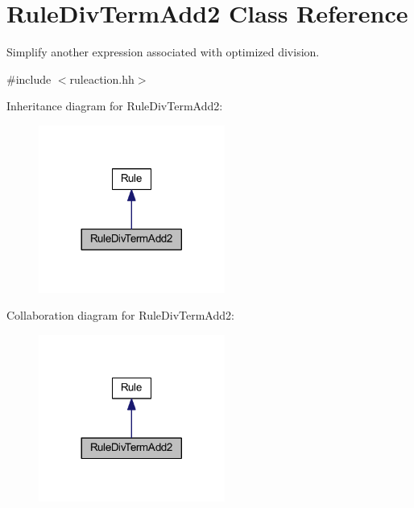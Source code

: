 \hypertarget{class_rule_div_term_add2}{}\section{Rule\+Div\+Term\+Add2 Class Reference}
\label{class_rule_div_term_add2}


Simplify another expression associated with optimized division.  




{\ttfamily \#include $<$ruleaction.\+hh$>$}



Inheritance diagram for Rule\+Div\+Term\+Add2\+:
\nopagebreak
\begin{figure}[H]
\begin{center}
\leavevmode
\includegraphics[width=173pt]{class_rule_div_term_add2__inherit__graph}
\end{center}
\end{figure}


Collaboration diagram for Rule\+Div\+Term\+Add2\+:
\nopagebreak
\begin{figure}[H]
\begin{center}
\leavevmode
\includegraphics[width=173pt]{class_rule_div_term_add2__coll__graph}
\end{center}
\end{figure}
